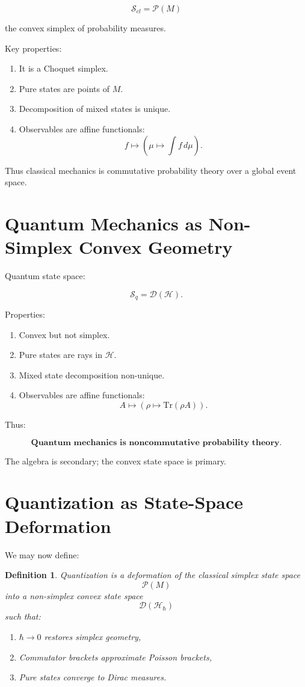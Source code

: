 \documentclass[11pt]{book}
\newtheorem{definition}[theorem]{Definition}
\begin{document}
\[
\mathcal{S}_{cl} = \mathcal{P}(M)
\]

the convex simplex of probability measures.

Key properties:

\begin{enumerate}
\item It is a Choquet simplex.
\item Pure states are points of $M$.
\item Decomposition of mixed states is unique.
\item Observables are affine functionals:
\[
f \mapsto \left(\mu \mapsto \int f\,d\mu\right).
\]
\end{enumerate}

Thus classical mechanics is commutative probability theory over a global event space.

\section{Quantum Mechanics as Non-Simplex Convex Geometry}

Quantum state space:

\[
\mathcal{S}_q = \mathcal{D}(\mathcal{H}).
\]

Properties:

\begin{enumerate}
\item Convex but not simplex.
\item Pure states are rays in $\mathcal{H}$.
\item Mixed state decomposition non-unique.
\item Observables are affine functionals:
\[
A \mapsto (\rho \mapsto \mathrm{Tr}(\rho A)).
\]
\end{enumerate}

Thus:

\[
\textbf{Quantum mechanics is noncommutative probability theory}.
\]

The algebra is secondary; the convex state space is primary.

\section{Quantization as State-Space Deformation}

We may now define:

\begin{definition}
Quantization is a deformation of the classical simplex state space
\[
\mathcal{P}(M)
\]
into a non-simplex convex state space
\[
\mathcal{D}(\mathcal{H}_\hbar)
\]
such that:
\begin{enumerate}
\item $\hbar \to 0$ restores simplex geometry,
\item Commutator brackets approximate Poisson brackets,
\item Pure states converge to Dirac measures.
\end{enumerate}
\end{definition}
\end{document}
